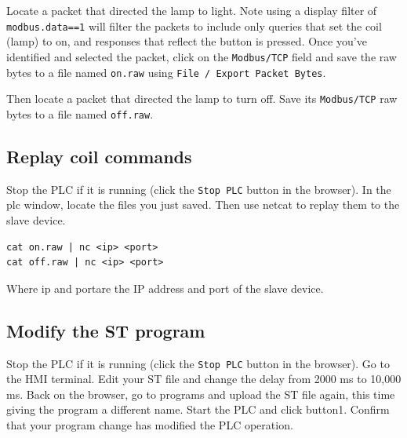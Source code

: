 Locate a packet that directed the lamp to light.  Note using a display filter of {\tt modbus.data==1} will filter the 
packets to include only queries that set the coil (lamp) to on, and responses that reflect the button is pressed.
Once you've identified and selected the packet, click on the {\tt Modbus/TCP} field and save the raw bytes to a file named
{\tt on.raw} using {\tt File / Export Packet Bytes}.  

Then locate a packet that directed the lamp to turn off.  Save its {\tt Modbus/TCP} raw bytes to a file named {\tt off.raw}.

\subsection{Replay coil commands}
Stop the PLC if it is running (click the {\tt Stop PLC} button in the browser).
In the plc window, locate the files you just saved.  Then use netcat to replay them to the slave device.
\begin{verbatim}
cat on.raw | nc <ip> <port>
cat off.raw | nc <ip> <port>
\end{verbatim}
\noindent Where ip and portare the IP address and port of the slave device.

\subsection{Modify the ST program}
Stop the PLC if it is running (click the {\tt Stop PLC} button in the browser).
Go to the HMI terminal.  
Edit your ST file and change the delay from 2000 ms to 10,000 ms.
Back on the browser, go to programs and upload the ST file again, this time giving the program a different name.
Start the PLC and click button1.  Confirm that your program change has modified the PLC operation.

